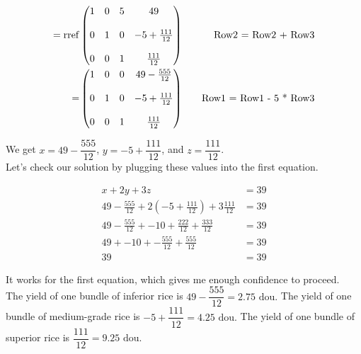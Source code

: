 \documentclass{article}
\begin{document}
\begin{align*}
= \mathop{\rm rref} & \begin{pmatrix}
1 & 0 & 5 & 49 \\ \\
0 & 1 & 0 & -5 + \frac{111}{12} \\ \\
0 & 0 & 1 & \frac{111}{12}
\end{pmatrix} \quad &\text{Row2 = Row2 + Row3} \\
= & \begin{pmatrix}
1 & 0 & 0 & 49 - \frac{555}{12} \\ \\
0 & 1 & 0 & -5 + \frac{111}{12} \\ \\
0 & 0 & 1 & \frac{111}{12}
\end{pmatrix} \quad &\text{Row1 = Row1 - 5 * Row3} \\
\end{align*}

We get $x = 49 - \dfrac{555}{12}$, $y = -5 + \dfrac{111}{12}$, and $z = \dfrac{111}{12}$. \\

Let's check our solution by plugging these values into the first equation.

\begin{align*}
x + 2y + 3z &= 39 \\
49 - \frac{555}{12} + 2(-5 + \frac{111}{12}) + 3 \frac{111}{12} &= 39 \\
49 - \frac{555}{12} + -10 + \frac{222}{12} + \frac{333}{12} &= 39 \\
49 + -10 + -\frac{555}{12} + \frac{555}{12} &= 39 \\
39 &= 39
\end{align*}

It works for the first equation, which gives me enough confidence to proceed. \\

The yield of one bundle of inferior rice is $\boxed{49 - \dfrac{555}{12} = 2.75 \text{ dou}.}$ The yield of one bundle of medium-grade rice is $\boxed{-5 + \dfrac{111}{12} = 4.25 \text{ dou}.}$ The yield of one bundle of superior rice is $\boxed{\dfrac{111}{12} = 9.25 \text{ dou}.}$
\end{document}
